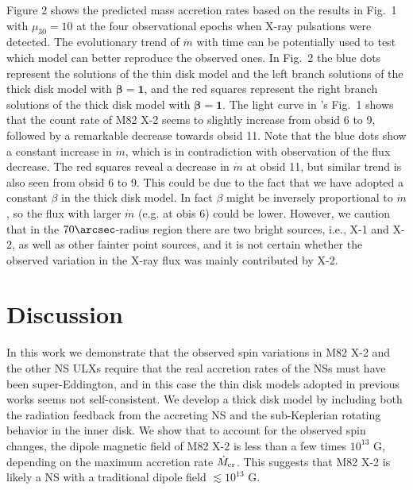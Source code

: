 \documentclass[12pt,preprint]{aastex}
\begin{document}
Figure 2 shows the predicted mass accretion rates based on the results in Fig.~1 with $\mu_{30}=10$ at the four observational epochs when X-ray pulsations were detected.
The evolutionary trend of $\dot{m}$ with time can be potentially used to test which model can better reproduce the observed ones.
In Fig.~2 the blue dots represent the solutions of the thin disk model and the left branch solutions of the thick disk model with $\bm{\beta=1}$, and the red squares  represent the right branch solutions of the thick disk model with $\bm{\beta=1}$. The light curve in \citet{bhw2014}'s Fig.~1 shows that the count rate of M82 X-2 seems  to slightly increase from obsid 6 to 9, followed by a remarkable decrease towards obsid 11. Note that the blue dots show a constant increase in $\dot{m}$, which is in contradiction with observation of the flux decrease. The red squares reveal a decrease in $\dot{m}$ at obsid 11, but similar trend is also seen from obsid 6 to 9. This could be due to the fact that we have adopted a constant $\beta$ in the thick disk model. In fact $\beta$ might be inversely proportional to $\dot{m}$ \citep{king2009}, so the flux with larger $\dot{m}$ (e.g. at obis 6) could be lower. However, we caution that in the $70\arcsec$-radius region there are two bright sources, i.e., X-1 and X-2, as well as other fainter point sources, and it is not certain whether the observed variation in the X-ray flux was mainly contributed by X-2.


\section{Discussion}

In this work we demonstrate that the observed spin variations in M82 X-2 and the other NS ULXs require that the real accretion rates of the NSs must have been super-Eddington, and in this case the thin disk models adopted in previous works seems not self-consistent. We develop a thick disk model by including both the radiation feedback from the accreting NS and the sub-Keplerian rotating behavior in the inner disk. We show that to account for the observed spin changes, the dipole magnetic field of M82 X-2 is less than a few times $10^{13}$ G, depending on the maximum accretion rate $\dot{M}_{\rm cr}$. This suggests that M82 X-2 is likely a NS with a traditional dipole field $\lesssim 10^{13}$ G.
\end{document}
